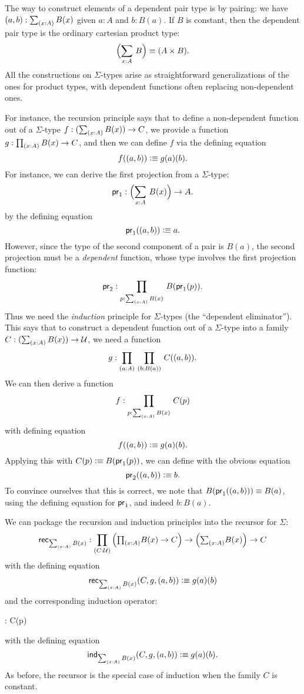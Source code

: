 %
%
The way to construct elements of a dependent pair type is by pairing: we have
$\tup{a}{b} : \sm{x:A} B(x)$ given $a:A$ and $b:B(a)$.
If $B$ is constant, then the dependent pair type is the
ordinary cartesian product type:
\[ \Parens{\sm{x:A} B} \jdeq (A \times B).\]
All the constructions on $\Sigma$-types arise as straightforward generalizations of the ones for product types, with dependent functions often replacing non-dependent ones.

For instance, the recursion principle%
says that to define a non-dependent function out of a $\Sigma$-type
$f : (\sm{x:A} B(x)) \to C$, we provide a function 
$g : \prd{x:A} B(x) \to C$, and then we can define $f$ via the defining
equation
\[ f((a,b)) \vcentcolon\equiv g(a)(b). \]
%
For instance, we can derive the first projection from a $\Sigma$-type:
%
\begin{equation*}
  \fst : \Parens{\sm{x : A}B(x)} \to A.
\end{equation*}
by the defining equation
\begin{equation*}
  \mathsf{pr}_{1}((a,b)) \vcentcolon\equiv a.
\end{equation*}
However, since the type of the second component of a pair
is $B(a)$, the second projection must be a \emph{dependent} function, whose type involves the first projection function:
%
\[ \snd : \prd{p:\sm{x : A}B(x)}B(\fst(p)). \]
Thus we need the \emph{induction} principle%
for $\Sigma$-types (the ``dependent eliminator'').
This says that to construct a dependent function out of a $\Sigma$-type into a family $C : (\sm{x:A} B(x)) \to \UU$, we need a function
\[ g : \prd{a:A}{b:B(a)} C(\tup{a}{b}). \]
We can then derive a function 
\[ f : \prd{p : \sm{x:A}B(x)} C(p) \]
with  defining equation
\[ f((a,b)) \vcentcolon\equiv g(a)(b).\]
Applying this with $C(p)\vcentcolon\equiv B(\mathsf{pr}_{1}(p))$, we can define
with the obvious equation
\[ \mathsf{pr}_{2}((a,b))  \vcentcolon\equiv  b. \]
To convince ourselves that this is correct, we note that $B (\mathsf{pr}_{1}((a,b))) \equiv B(a)$, using the defining equation for $\mathsf{pr}_{1}$, and
indeed $b : B(a)$.

We can package the recursion and induction principles into the recursor for $\Sigma$:
%
\[ \rec{\sm{x:A}B(x)} : \dprd{C:\UU}\Parens{\tprd{x:A} B(x) \to C} \to
\Parens{\tsm{x:A}B(x)} \to C \]
with the defining equation
\[ \rec{\sm{x:A}B(x)}(C,g,\tup{a}{b}) \defeq g(a)(b) \]
and the corresponding induction operator:
%
\begin{narrowmultline*}
   : \narrowbreak
    \to {} C(p)
\end{narrowmultline*}
with the defining equation 
\[ \ind{\sm{x:A}B(x)}(C,g,\tup{a}{b}) \defeq g(a)(b). \]
As before, the recursor is the special case of induction
when the family $C$ is constant.

